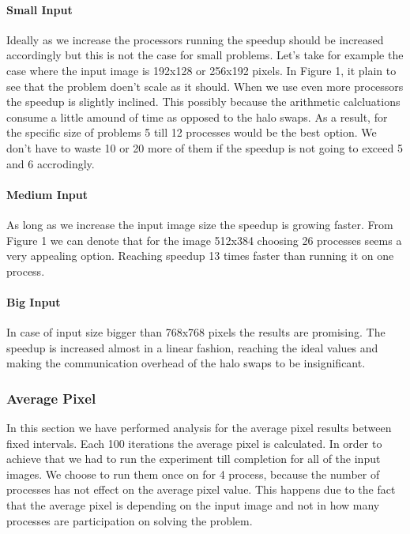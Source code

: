 \documentclass[12pt,a4paper]{article}
\begin{document}
            \paragraph{Small Input}
                Ideally as we increase the processors running the speedup should be increased accordingly but this is not the case for small problems. Let's take for example the case where the input image is 192x128 or 256x192 pixels. In Figure 1, it plain to see that the problem doen't scale as it should. When we use even more processors the speedup is slightly inclined. This possibly because the arithmetic calcluations consume a little amound of time as opposed to the halo swaps. As a result, for the specific size of problems 5 till 12 processes would be the best option. We don't have to waste 10 or 20 more of them if the speedup is not going to exceed 5 and 6 accrodingly.
 
             \paragraph{Medium Input}
                As long as we increase the input image size the speedup is growing faster. From Figure 1 we can denote that for the image 512x384 choosing 26 processes seems a very appealing option. Reaching speedup 13 times faster than running it on one process.

            \paragraph{Big Input}
                In case of input size bigger than 768x768 pixels the results are promising. The speedup is increased almost in a linear fashion, reaching the ideal values and making the communication overhead of the halo swaps to be insignificant. 

        \subsubsection{Average Pixel}

        	In this section we have performed analysis for the average pixel results between fixed intervals. Each 100 iterations the average pixel is calculated. In order to achieve that we had to run the experiment till completion for all of the input images. We choose to run them once on for 4 process, because the number of processes has not effect on the average pixel value. This happens due to the fact that the average pixel is depending on the input image and not in how many processes are participation on solving the problem.
\end{document}
